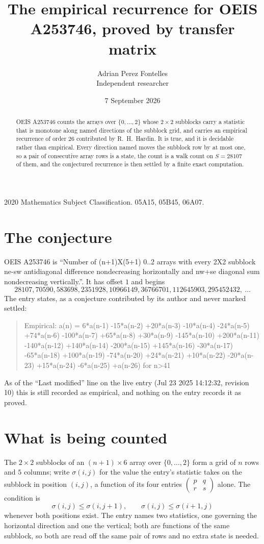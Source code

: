 \documentclass[11pt,a4paper]{article}
\title{The empirical recurrence for OEIS A253746, proved by transfer matrix}
\author{Adrian Perez Fontelles\\ \small Independent researcher}
\date{7 September 2026}
\theoremstyle{plain}
\theoremstyle{definition}
\begin{document}
\maketitle

\begin{abstract}
OEIS A253746 counts the arrays over $\{0,\dots,2\}$ whose $2\times2$ subblocks carry a
statistic that is monotone along named directions of the subblock grid, and carries an
empirical recurrence of order $26$ contributed by R.~H.~Hardin. It is true, and it is
decidable rather than empirical. Every direction named moves the subblock row by at most one,
so a pair of consecutive array rows is a state, the count is a walk count on $S=28107$ of them,
and the conjectured recurrence is then settled by a finite exact computation.
\end{abstract}

\noindent\small 2020 Mathematics Subject Classification. 05A15, 05B45, 06A07.\normalsize

\section{The conjecture}

OEIS A253746 is ``Number of (n+1)X(5+1) 0..2 arrays with every 2X2 subblock ne-sw antidiagonal difference nondecreasing horizontally and nw+se diagonal sum nondecreasing vertically.''. It has offset $1$ and begins
\[
28107, 70590, 583698, 2351928, 10966149, 36766701, 112645903, 295452432,\ \dots
\]
The entry states, as a conjecture contributed by its author and never marked settled:
\begin{quote}
Empirical: a(n) = 6*a(n-1) -15*a(n-2) +20*a(n-3) -10*a(n-4) -24*a(n-5) +74*a(n-6) -100*a(n-7) +65*a(n-8) +30*a(n-9) -145*a(n-10) +200*a(n-11) -140*a(n-12) +140*a(n-14) -200*a(n-15) +145*a(n-16) -30*a(n-17) -65*a(n-18) +100*a(n-19) -74*a(n-20) +24*a(n-21) +10*a(n-22) -20*a(n-23) +15*a(n-24) -6*a(n-25) +a(n-26) for n>41
\end{quote}
As of the ``Last modified'' line on the live entry (Jul 23 2025 14:12:32, revision 10) this is still
recorded as empirical, and nothing on the entry records it as proved.

\section{What is being counted}

The $2\times2$ subblocks of an $(n+1)\times6$ array over $\{0,\dots,2\}$ form a grid
of $n$ rows and $5$ columns; write $\sigma(i,j)$ for the value the entry's statistic takes on
the subblock in position $(i,j)$, a function of its four entries
$\begin{pmatrix}p&q\\r&s\end{pmatrix}$ alone. The condition is
\[
\sigma(i,j)\le\sigma(i,j+1),\qquad \sigma(i,j)\le\sigma(i+1,j)
\]
whenever both positions exist. The entry names two statistics, one governing the horizontal direction and one the vertical; both are functions of the same subblock, so both are read off the same pair of rows and no extra state is needed.
\end{document}
